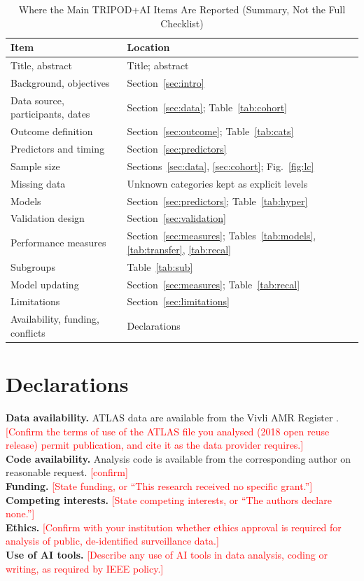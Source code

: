 \documentclass[conference]{IEEEtran}
\newif\ifdraft \drafttrue
\newcommand{\authornote}[1]{\ifdraft\textcolor{red}{[#1]}\fi}
\begin{document}
\begin{table}[!t]
\caption{Where the Main TRIPOD+AI Items Are Reported (Summary, Not the Full Checklist)}\label{tab:tripod}
\centering\scriptsize
\begin{tabular}{>{\raggedright\arraybackslash}p{3.0cm}>{\raggedright\arraybackslash}p{4.9cm}}
\toprule
Item & Location \\
\midrule
Title, abstract & Title; abstract \\
Background, objectives & Section~\ref{sec:intro} \\
Data source, participants, dates & Section~\ref{sec:data}; Table~\ref{tab:cohort} \\
Outcome definition & Section~\ref{sec:outcome}; Table~\ref{tab:cats} \\
Predictors and timing & Section~\ref{sec:predictors} \\
Sample size & Sections~\ref{sec:data}, \ref{sec:cohort}; Fig.~\ref{fig:lc} \\
Missing data & Unknown categories kept as explicit levels \\
Models & Section~\ref{sec:predictors}; Table~\ref{tab:hyper} \\
Validation design & Section~\ref{sec:validation} \\
Performance measures & Section~\ref{sec:measures}; Tables~\ref{tab:models}, \ref{tab:transfer}, \ref{tab:recal} \\
Subgroups & Table~\ref{tab:sub} \\
Model updating & Section~\ref{sec:measures}; Table~\ref{tab:recal} \\
Limitations & Section~\ref{sec:limitations} \\
Availability, funding, conflicts & Declarations \\
\bottomrule
\end{tabular}
\end{table}


\section*{Declarations}
\noindent\textbf{Data availability.} ATLAS data are available from the Vivli AMR Register \cite{vivli}. \authornote{Confirm the terms of use of the ATLAS file you analysed (2018 open reuse release) permit publication, and cite it as the data provider requires.}\\
\textbf{Code availability.} Analysis code is available from the corresponding author on reasonable request. \authornote{confirm}\\
\textbf{Funding.} \authornote{State funding, or ``This research received no specific grant.''}\\
\textbf{Competing interests.} \authornote{State competing interests, or ``The authors declare none.''}\\
\textbf{Ethics.} \authornote{Confirm with your institution whether ethics approval is required for analysis of public, de-identified surveillance data.}\\
\textbf{Use of AI tools.} \authornote{Describe any use of AI tools in data analysis, coding or writing, as required by IEEE policy.}
\end{document}

